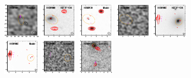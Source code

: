 \documentclass[iop]{emulateapj}
\begin{document}
\begin{figure}[!tbp]
\begin{centering}
\includegraphics[width=0.162\textwidth]{../Figures/modelfit/HXMM04_residual_bestfit.pdf}
\includegraphics[width=0.162\textwidth]{../Figures/modelfit/HXMM09_optical_bestfit.pdf}
\includegraphics[width=0.162\textwidth]{../Figures/modelfit/HXMM09_model_bestfit.pdf}
\includegraphics[width=0.162\textwidth]{../Figures/modelfit/HXMM09_residual_bestfit.pdf}
\includegraphics[width=0.162\textwidth]{../Figures/modelfit/HXMM03_optical_bestfit.pdf}
\includegraphics[width=0.162\textwidth]{../Figures/modelfit/HXMM03_model_bestfit.pdf}
\includegraphics[width=0.162\textwidth]{../Figures/modelfit/HXMM03_residual_bestfit.pdf}
\includegraphics[width=0.162\textwidth]{../Figures/modelfit/HXMM11_optical_bestfit.pdf}

\end{centering}
\end{figure}
\end{document}
